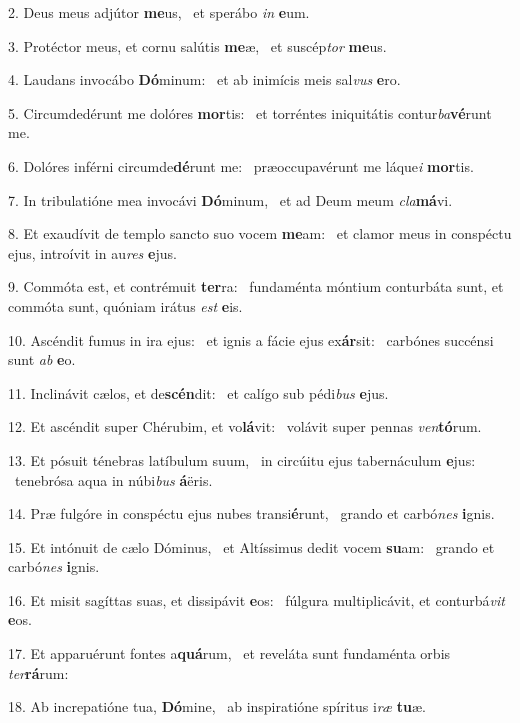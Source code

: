 2. Deus meus adjútor \textbf{me}us, \ast\  et sperábo \textit{in} \textbf{e}um.\

3. Protéctor meus, et cornu salútis \textbf{me}æ, \ast\  et suscép\textit{tor} \textbf{me}us.\

4. Laudans invocábo \textbf{Dó}minum: \ast\  et ab inimícis meis sal\textit{vus} \textbf{e}ro.\

5. Circumdedérunt me dolóres \textbf{mor}tis: \ast\  et torréntes iniquitátis contur\textit{ba}\textbf{vé}runt me.\

6. Dolóres inférni circumde\textbf{dé}runt me: \ast\  præoccupavérunt me láque\textit{i} \textbf{mor}tis.\

7. In tribulatióne mea invocávi \textbf{Dó}minum, \ast\  et ad Deum meum \textit{cla}\textbf{má}vi.\

8. Et exaudívit de templo sancto suo vocem \textbf{me}am: \ast\  et clamor meus in conspéctu ejus, introívit in au\textit{res} \textbf{e}jus.\

9. Commóta est, et contrémuit \textbf{ter}ra: \ast\  fundaménta móntium conturbáta sunt, et commóta sunt, quóniam irátus \textit{est} \textbf{e}is.\

10. Ascéndit fumus in ira ejus: \dag\  et ignis a fácie ejus ex\textbf{ár}sit: \ast\  carbónes succénsi sunt \textit{ab} \textbf{e}o.\

11. Inclinávit cælos, et de\textbf{scén}dit: \ast\  et calígo sub pédi\textit{bus} \textbf{e}jus.\

12. Et ascéndit super Chérubim, et vo\textbf{lá}vit: \ast\  volávit super pennas \textit{ven}\textbf{tó}rum.\

13. Et pósuit ténebras latíbulum suum, \dag\  in circúitu ejus tabernáculum \textbf{e}jus: \ast\  tenebrósa aqua in núbi\textit{bus} \textbf{á}ëris.\

14. Præ fulgóre in conspéctu ejus nubes transi\textbf{é}runt, \ast\  grando et carbó\textit{nes} \textbf{i}gnis.\

15. Et intónuit de cælo Dóminus, \dag\  et Altíssimus dedit vocem \textbf{su}am: \ast\  grando et carbó\textit{nes} \textbf{i}gnis.\

16. Et misit sagíttas suas, et dissipávit \textbf{e}os: \ast\  fúlgura multiplicávit, et conturbá\textit{vit} \textbf{e}os.\

17. Et apparuérunt fontes a\textbf{quá}rum, \ast\  et reveláta sunt fundaménta orbis \textit{ter}\textbf{rá}rum:\

18. Ab increpatióne tua, \textbf{Dó}mine, \ast\  ab inspiratióne spíritus i\textit{ræ} \textbf{tu}æ.\

